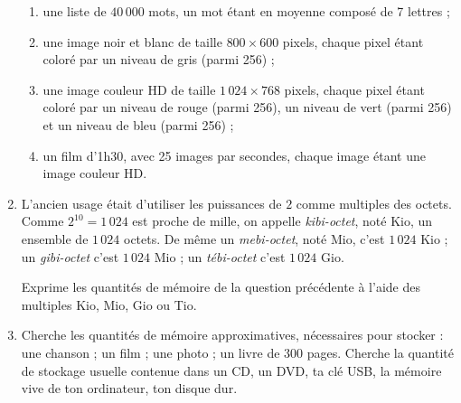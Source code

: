 \documentclass[class=report,crop=false, 12pt]{standalone}
\begin{document}
\begin{activite}
\begin{enumerate}
\begin{enumerate}
    \item une liste de $40\,000$ mots, un mot étant en moyenne composé de 7 lettres ;
    
    \item une image noir et blanc de taille $800 \times 600$ pixels, chaque pixel étant coloré par un niveau de gris (parmi 256) ;
    
    \item  une image couleur HD de taille $1\,024 \times 768$ pixels, chaque pixel étant coloré par un niveau de rouge (parmi 256), un niveau de vert (parmi 256) et un niveau de bleu  (parmi 256) ;
  
    \item un film d'1h30, avec 25 images par secondes, chaque image étant une image couleur HD.     
    
  \end{enumerate}  

 
  
  \item L'ancien usage était d'utiliser les puissances de $2$ comme multiples des octets.
  Comme $2^{10}= 1\,024$ est proche de mille, on appelle \emph{kibi-octet}, noté Kio, un ensemble de $1\,024$ octets. 
  De même un \emph{mebi-octet}, noté Mio, c'est $1\,024$ Kio ; un \emph{gibi-octet} c'est $1\,024$ Mio ;
  un \emph{tébi-octet} c'est $1\,024$ Gio.
  
  Exprime les quantités de mémoire de la question précédente à l'aide des multiples Kio, Mio, Gio ou Tio.
  
  \item Cherche les quantités de mémoire approximatives, nécessaires pour stocker : une chanson ; un film ;
  une photo ;  un livre de 300 pages. Cherche la quantité de stockage usuelle contenue dans 
  un CD, un DVD, ta clé USB, la mémoire vive de ton ordinateur, ton disque dur.  

\end{enumerate}
\end{activite}
\end{document}
